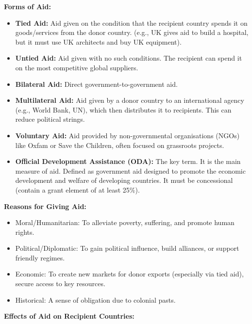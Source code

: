 \documentclass[11pt, a4paper, twoside]{book}
\begin{document}
\textbf{Forms of Aid:}
\begin{itemize}
  \item \textbf{Tied Aid:} Aid given on the condition that the recipient country spends it on goods/services from the donor country. (e.g., UK gives aid to build a hospital, but it must use UK architects and buy UK equipment).
  \item \textbf{Untied Aid:} Aid given with no such conditions. The recipient can spend it on the most competitive global suppliers.
  \item \textbf{Bilateral Aid:} Direct government-to-government aid.
  \item \textbf{Multilateral Aid:} Aid given by a donor country to an international agency (e.g., World Bank, UN), which then distributes it to recipients. This can reduce political strings.
  \item \textbf{Voluntary Aid:} Aid provided by non-governmental organisations (NGOs) like Oxfam or Save the Children, often focused on grassroots projects.
  \item \textbf{Official Development Assistance (ODA):} The key term. It is the main measure of aid. Defined as government aid designed to promote the economic development and welfare of developing countries. It must be concessional (contain a grant element of at least 25\%).
\end{itemize}

\textbf{Reasons for Giving Aid:}
\begin{itemize}
  \item Moral/Humanitarian: To alleviate poverty, suffering, and promote human rights.
  \item Political/Diplomatic: To gain political influence, build alliances, or support friendly regimes.
  \item Economic: To create new markets for donor exports (especially via tied aid), secure access to key resources.
  \item Historical: A sense of obligation due to colonial pasts.
\end{itemize}

\textbf{Effects of Aid on Recipient Countries:}
\end{document}

